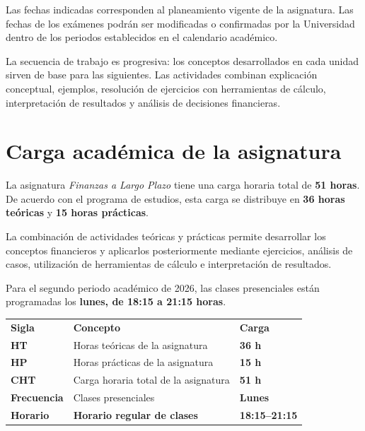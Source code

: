 \documentclass[12pt,a4paper]{article}
\begin{document}
\noindent
Las fechas indicadas corresponden al planeamiento vigente de la asignatura.
Las fechas de los exámenes podrán ser modificadas o confirmadas por la
Universidad dentro de los periodos establecidos en el calendario académico.\parencite{armoa2026planeamiento,ua2026calendarioAcademico}

La secuencia de trabajo es progresiva: los conceptos desarrollados en cada
unidad sirven de base para las siguientes. Las actividades combinan
explicación conceptual, ejemplos, resolución de ejercicios con herramientas
de cálculo, interpretación de resultados y análisis de decisiones financieras.

\section{Carga académica de la asignatura}

La asignatura \textit{Finanzas a Largo Plazo} tiene una carga horaria total de
\textbf{51 horas}. De acuerdo con el programa de estudios, esta carga se
distribuye en \textbf{36 horas teóricas} y \textbf{15 horas prácticas}.\parencite{uaProgramaFinanzasLargoPlazo,armoa2026planeamiento}

La combinación de actividades teóricas y prácticas permite desarrollar los
conceptos financieros y aplicarlos posteriormente mediante ejercicios,
análisis de casos, utilización de herramientas de cálculo e interpretación
de resultados.

Para el segundo periodo académico de 2026, las clases presenciales están
programadas los \textbf{lunes, de 18:15 a 21:15 horas}.\parencite{armoa2026planeamiento}

\begin{center}
\renewcommand{\arraystretch}{1.3}

\begin{tabularx}{\textwidth}{
    >{\centering\arraybackslash}p{1.7cm}
    X
    >{\centering\arraybackslash}p{2.5cm}
}

\rowcolor{calAzul}
\color{white}\textbf{Sigla} &
\color{white}\textbf{Concepto} &
\color{white}\textbf{Carga} \\

\rowcolor{calAzulClaro}
\textbf{HT} &
Horas teóricas de la asignatura &
\textbf{36 h} \\

\rowcolor{calVerdeClaro}
\textbf{HP} &
Horas prácticas de la asignatura &
\textbf{15 h} \\

\rowcolor{calAmarilloClaro}
\textbf{CHT} &
Carga horaria total de la asignatura &
\textbf{51 h} \\

\rowcolor{calGrisClaro}
\textbf{Frecuencia} &
Clases presenciales &
\textbf{Lunes} \\

\rowcolor{calAzul}
\color{white}\textbf{Horario} &
\color{white}\textbf{Horario regular de clases} &
\color{white}\textbf{18:15--21:15} \\

\end{tabularx}
\end{center}
\end{document}
